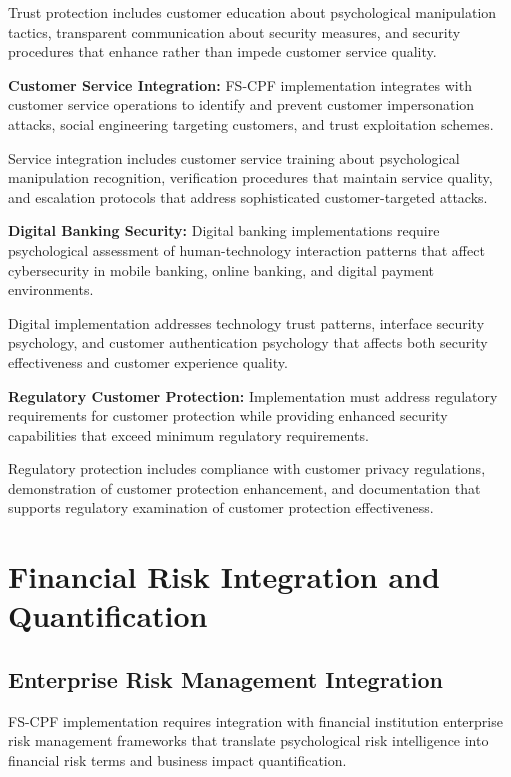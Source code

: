 \documentclass[10pt, twocolumn]{article}
\begin{document}
Trust protection includes customer education about psychological manipulation tactics, transparent communication about security measures, and security procedures that enhance rather than impede customer service quality.

\textbf{Customer Service Integration:} FS-CPF implementation integrates with customer service operations to identify and prevent customer impersonation attacks, social engineering targeting customers, and trust exploitation schemes.

Service integration includes customer service training about psychological manipulation recognition, verification procedures that maintain service quality, and escalation protocols that address sophisticated customer-targeted attacks.

\textbf{Digital Banking Security:} Digital banking implementations require psychological assessment of human-technology interaction patterns that affect cybersecurity in mobile banking, online banking, and digital payment environments.

Digital implementation addresses technology trust patterns, interface security psychology, and customer authentication psychology that affects both security effectiveness and customer experience quality.

\textbf{Regulatory Customer Protection:} Implementation must address regulatory requirements for customer protection while providing enhanced security capabilities that exceed minimum regulatory requirements.

Regulatory protection includes compliance with customer privacy regulations, demonstration of customer protection enhancement, and documentation that supports regulatory examination of customer protection effectiveness.

\section{Financial Risk Integration and Quantification}

\subsection{Enterprise Risk Management Integration}

FS-CPF implementation requires integration with financial institution enterprise risk management frameworks that translate psychological risk intelligence into financial risk terms and business impact quantification.
\end{document}
